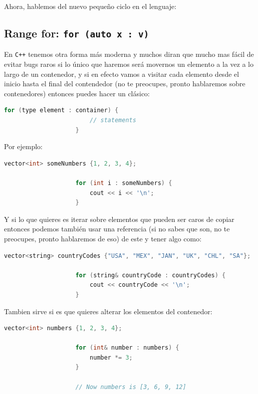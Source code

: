 \documentclass[12pt, fleqn]{report}                             %
\theoremstyle{break}                                            %
\newcommand{\textCode}[1]  { \texttt{#1} }                      %
\newcommand{\Cpp}{\ignorespaces\textCode{C++}}                  %
\begin{document}
                Ahora, hablemos del nuevo pequeño ciclo en el lenguaje:

            \subsection{Range for: \textCode{for (auto x : v)}}

                En \Cpp tenemos otra forma más moderna y muchos diran que mucho mas
                fácil de evitar bugs raros si lo único que haremos será movernos un 
                elemento a la vez a lo largo de un contenedor, y si en efecto vamos a visitar cada
                elemento desde el inicio hasta el final del contendedor (no te preocupes, pronto
                hablaremos sobre contenedores) entonces puedes hacer un clásico:
                \begin{lstlisting}[language=C++, gobble=20]
                    for (type element : container) {
                        // statements
                    }
                \end{lstlisting}

                Por ejemplo:
                \begin{lstlisting}[language=C++, gobble=20]
                    vector<int> someNumbers {1, 2, 3, 4};

                    for (int i : someNumbers) {
                        cout << i << '\n';
                    }
                \end{lstlisting}

                Y si lo que quieres es iterar sobre elementos que pueden ser caros de copiar entonces
                podemos también usar una referencia (si no sabes que son, no te preocupes, pronto hablaremos de eso)
                de este y tener algo como:
                \begin{lstlisting}[language=C++, gobble=20]
                    vector<string> countryCodes {"USA", "MEX", "JAN", "UK", "CHL", "SA"};

                    for (string& countryCode : countryCodes) {
                        cout << countryCode << '\n';
                    }
                \end{lstlisting}

                Tambien sirve si es que quieres alterar los elementos del contenedor:
                \begin{lstlisting}[language=C++, gobble=20]
                    vector<int> numbers {1, 2, 3, 4};

                    for (int& number : numbers) {
                        number *= 3;
                    }

                    // Now numbers is [3, 6, 9, 12]
                \end{lstlisting}
\end{document}
